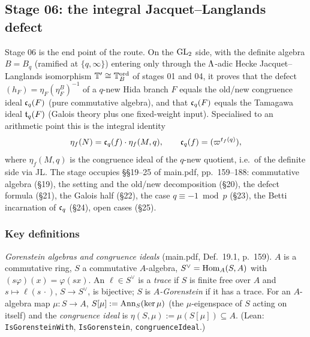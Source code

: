 \subsection{Stage 06: the integral Jacquet--Langlands defect}\label{ss:stage06}

Stage 06 is the end point of the route. On the $\mathrm{GL}_2$ side, with the definite algebra $B=B_q$ (ramified at $\{q,\infty\}$) entering
only through the $\Lambda$-adic Hecke Jacquet--Langlands isomorphism $\mathbb{T}'\cong\mathbb{T}^{\mathrm{ord}}_B$ of stages 01 and 04, it proves that the
defect $(h_F)=\eta_F(\eta^B_F)^{-1}$ of a $q$-new Hida branch $F$ equals the old/new congruence ideal $\mathfrak{c}_q(F)$ (pure commutative
algebra), and that $\mathfrak{c}_q(F)$ equals the Tamagawa ideal $\mathfrak{t}_q(F)$ (Galois theory plus one fixed-weight input). Specialised to an
arithmetic point this is the integral identity
\[\eta_f(N)=\mathfrak{c}_q(f)\cdot\eta_f(M,q),\qquad \mathfrak{c}_q(f)=(\varpi^{t_f(q)}),\]
where $\eta_f(M,q)$ is the congruence ideal of the $q$-new quotient, i.e.\ of the definite side via JL. The stage occupies
\S\S19--25 of main.pdf, pp.~159--188: commutative algebra (\S19), the setting and the old/new decomposition (\S20), the defect formula
(\S21), the Galois half (\S22), the case $q\equiv-1\bmod p$ (\S23), the Betti incarnation of $\mathfrak{c}_q$ (\S24), open cases (\S25).

\subsubsection*{Key definitions}

\emph{Gorenstein algebras and congruence ideals} (main.pdf, Def.~19.1, p.~159). $A$ is a commutative ring, $S$ a commutative
$A$-algebra, $S^\vee=\operatorname{Hom}_A(S,A)$ with $(s\varphi)(x)=\varphi(sx)$. An $\ell\in S^\vee$ is a \emph{trace} if $S$ is finite free over $A$
and $s\mapsto\ell(s\,\cdot)$, $S\to S^\vee$, is bijective; $S$ is \emph{$A$-Gorenstein} if it has a trace. For an $A$-algebra map
$\mu:S\to A$, $S[\mu]:=\operatorname{Ann}_S(\ker\mu)$ (the $\mu$-eigenspace of $S$ acting on itself) and the \emph{congruence ideal} is
$\eta(S,\mu):=\mu(S[\mu])\subseteq A$. (Lean: \texttt{IsGorensteinWith}, \texttt{IsGorenstein}, \texttt{congruenceIdeal}.)

